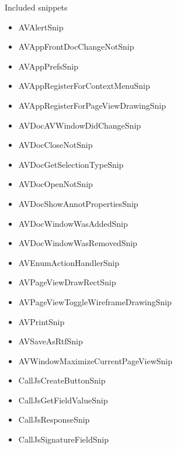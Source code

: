 \documentclass[letterpaper,12pt,english,openany,oneside]{sphinxmanual}
\begin{document}
Included snippets
\begin{itemize}
\item {} 
AVAlertSnip

\item {} 
AVAppFrontDocChangeNotSnip

\item {} 
AVAppPrefsSnip

\item {} 
AVAppRegisterForContextMenuSnip

\item {} 
AVAppRegisterForPageViewDrawingSnip

\item {} 
AVDocAVWindowDidChangeSnip

\item {} 
AVDocCloseNotSnip

\item {} 
AVDocGetSelectionTypeSnip

\item {} 
AVDocOpenNotSnip

\item {} 
AVDocShowAnnotPropertiesSnip

\item {} 
AVDocWindowWasAddedSnip

\item {} 
AVDocWindowWasRemovedSnip

\item {} 
AVEnumActionHandlerSnip

\item {} 
AVPageViewDrawRectSnip

\item {} 
AVPageViewToggleWireframeDrawingSnip

\item {} 
AVPrintSnip

\item {} 
AVSaveAsRtfSnip

\item {} 
AVWindowMaximizeCurrentPageViewSnip

\item {} 
CallJsCreateButtonSnip

\item {} 
CallJsGetFieldValueSnip

\item {} 
CallJsResponseSnip

\item {} 
CallJsSignatureFieldSnip


\end{itemize}
\end{document}
